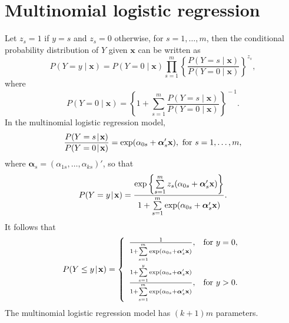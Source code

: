\documentclass[man,floatmark,12pt]{apa}
\begin{document}
\section{Multinomial logistic regression}
Let $z_{s}=1$ if $y=s$ and $z_{s}=0$ otherwise, for $s=1,\ldots,m$, then the conditional probability distribution of $Y$ given $\mathbf{x}$ can be written as
\begin{equation}
P(Y=y\!\mid\!\mathbf{x})=P(Y=0\!\mid\!\mathbf{x})\prod_{s=1}^{m}\!\left\{\frac{P(Y=s\!\mid\!\mathbf{x})}{P(Y=0\!\mid\!\mathbf{x})}\right\}^{\!z_{s}},
\end{equation}
where
\begin{equation}
P(Y=0\!\mid\!\mathbf{x})=\left\{1+\sum_{s=1}^{m}\frac{P(Y=s\!\mid\!\mathbf{x})}{P(Y=0\!\mid\!\mathbf{x})}\right\}^{\!-1}.
\end{equation}
In the multinomial logistic regression model,
\begin{equation}
\frac{P(Y=s\!\mid\!\mathbf{x})}{P(Y=0\!\mid\!\mathbf{x})}=\textup{exp}(\alpha_{0s}+\bm{\alpha}'_{s}\mathbf{x}),\ \textup{for $s=1,\ldots,m$},
\end{equation}
where $\bm{\alpha}_{s}=(\alpha_{1s},\ldots,\alpha_{ks})'$, so that
\begin{equation}
P(Y=y\!\mid\!\mathbf{x})=\frac{\textup{exp}\left\{\sum\limits_{s=1}^{m}z_{s}(\alpha_{0s}+\bm{\alpha}'_{s}\mathbf{x})\right\}}{1+\sum\limits_{s=1}^{m}\textup{exp}(\alpha_{0s}+\bm{\alpha}'_{s}\mathbf{x})}.
\end{equation}
It follows that
\begin{equation}
P(Y\leq y\!\mid\!\mathbf{x})=\left\{\begin{array}{ll}\frac{1}{1+\sum\limits_{s=1}^{m}\textup{exp}(\alpha_{0s}+\bm{\alpha}'_{s}\mathbf{x})},&\textup{for $y=0$},\\
\rule{0cm}{1cm}\frac{1+\sum\limits_{s=1}^{y}\textup{exp}(\alpha_{0s}+\bm{\alpha}'_{s}\mathbf{x})}{1+\sum\limits_{s=1}^{m}\textup{exp}(\alpha_{0s}+\bm{\alpha}'_{s}\mathbf{x})},&\textup{for $y>0$}.
\end{array}\right.
\end{equation}
The multinomial logistic regression model has $(k+1)m$ parameters.
\end{document}
